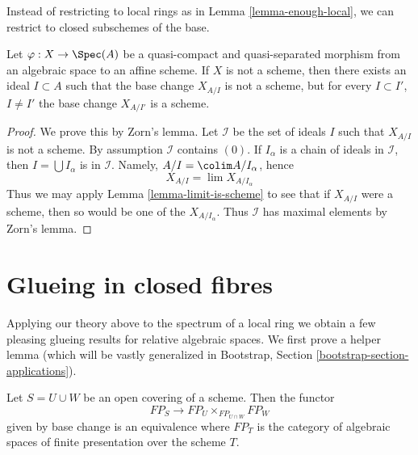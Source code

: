 \noindent
Instead of restricting to local rings as in Lemma \ref{lemma-enough-local},
we can restrict to closed subschemes of the base.

\begin{lemma}
\label{lemma-maximal-ideal}
Let $\varphi : X \to \Spec(A)$ be a quasi-compact and quasi-separated
morphism from an algebraic space to an affine scheme.
If $X$ is not a scheme, then there exists an ideal $I \subset A$
such that the base change $X_{A/I}$ is not a scheme, but
for every $I \subset I'$, $I \not = I'$ the base change
$X_{A/I'}$ is a scheme.
\end{lemma}

\begin{proof}
We prove this by Zorn's lemma. Let $\mathcal{I}$ be the set
of ideals $I$ such that $X_{A/I}$ is not a scheme. By
assumption $\mathcal{I}$ contains $(0)$. If $I_\alpha$ is
a chain of ideals in $\mathcal{I}$, then
$I = \bigcup I_\alpha$ is in $\mathcal{I}$. Namely,
$A/I = \colim A/I_\alpha$, hence
$$
X_{A/I} = \lim X_{A/I_\alpha}
$$
Thus we may apply Lemma \ref{lemma-limit-is-scheme} to see that if $X_{A/I}$
were a scheme, then so would be one of the $X_{A/I_\alpha}$.
Thus $\mathcal{I}$ has maximal elements by Zorn's lemma.
\end{proof}






\section{Glueing in closed fibres}
\label{section-change-over-closed-points}

\noindent
Applying our theory above to the spectrum of a local ring we obtain
a few pleasing glueing results for relative algebraic spaces.
We first prove a helper lemma (which will be vastly generalized
in Bootstrap, Section \ref{bootstrap-section-applications}).

\begin{lemma}
\label{lemma-relative-glueing}
Let $S = U \cup W$ be an open covering of a scheme. Then the functor
$$
FP_S \longrightarrow FP_U \times_{FP_{U \cap W}} FP_W
$$
given by base change is an equivalence where $FP_T$
is the category of algebraic spaces of finite presentation over
the scheme $T$.
\end{lemma}

